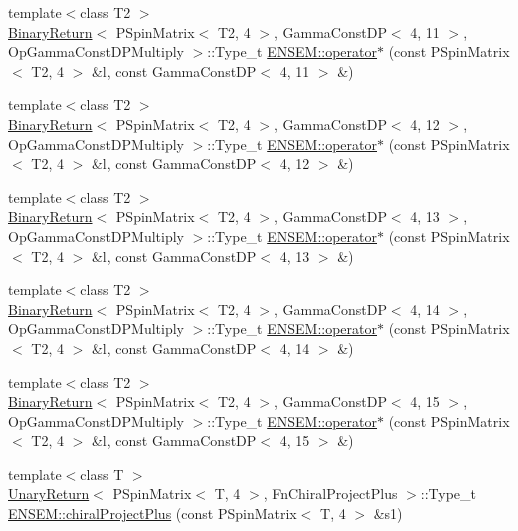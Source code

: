 \begin{DoxyCompactItemize}
\item 
{\footnotesize template$<$class T2 $>$ }\\\mbox{\hyperlink{structBinaryReturn}{Binary\+Return}}$<$ P\+Spin\+Matrix$<$ T2, 4 $>$, Gamma\+Const\+DP$<$ 4, 11 $>$, Op\+Gamma\+Const\+D\+P\+Multiply $>$\+::Type\+\_\+t \mbox{\hyperlink{group__primspinmatrix_gafdfa5cea94c5b8301c476e73bf94071c}{E\+N\+S\+E\+M\+::operator$\ast$}} (const P\+Spin\+Matrix$<$ T2, 4 $>$ \&l, const Gamma\+Const\+DP$<$ 4, 11 $>$ \&)
\item 
{\footnotesize template$<$class T2 $>$ }\\\mbox{\hyperlink{structBinaryReturn}{Binary\+Return}}$<$ P\+Spin\+Matrix$<$ T2, 4 $>$, Gamma\+Const\+DP$<$ 4, 12 $>$, Op\+Gamma\+Const\+D\+P\+Multiply $>$\+::Type\+\_\+t \mbox{\hyperlink{group__primspinmatrix_ga554a403dc2f232b906a5f7a9971eced3}{E\+N\+S\+E\+M\+::operator$\ast$}} (const P\+Spin\+Matrix$<$ T2, 4 $>$ \&l, const Gamma\+Const\+DP$<$ 4, 12 $>$ \&)
\item 
{\footnotesize template$<$class T2 $>$ }\\\mbox{\hyperlink{structBinaryReturn}{Binary\+Return}}$<$ P\+Spin\+Matrix$<$ T2, 4 $>$, Gamma\+Const\+DP$<$ 4, 13 $>$, Op\+Gamma\+Const\+D\+P\+Multiply $>$\+::Type\+\_\+t \mbox{\hyperlink{group__primspinmatrix_ga1b7bc726f48b4c37350818e1d825d16d}{E\+N\+S\+E\+M\+::operator$\ast$}} (const P\+Spin\+Matrix$<$ T2, 4 $>$ \&l, const Gamma\+Const\+DP$<$ 4, 13 $>$ \&)
\item 
{\footnotesize template$<$class T2 $>$ }\\\mbox{\hyperlink{structBinaryReturn}{Binary\+Return}}$<$ P\+Spin\+Matrix$<$ T2, 4 $>$, Gamma\+Const\+DP$<$ 4, 14 $>$, Op\+Gamma\+Const\+D\+P\+Multiply $>$\+::Type\+\_\+t \mbox{\hyperlink{group__primspinmatrix_ga701841ed0546a547ae068731f72d9054}{E\+N\+S\+E\+M\+::operator$\ast$}} (const P\+Spin\+Matrix$<$ T2, 4 $>$ \&l, const Gamma\+Const\+DP$<$ 4, 14 $>$ \&)
\item 
{\footnotesize template$<$class T2 $>$ }\\\mbox{\hyperlink{structBinaryReturn}{Binary\+Return}}$<$ P\+Spin\+Matrix$<$ T2, 4 $>$, Gamma\+Const\+DP$<$ 4, 15 $>$, Op\+Gamma\+Const\+D\+P\+Multiply $>$\+::Type\+\_\+t \mbox{\hyperlink{group__primspinmatrix_ga06378dd69a5d2daf15d11b69a3f42acd}{E\+N\+S\+E\+M\+::operator$\ast$}} (const P\+Spin\+Matrix$<$ T2, 4 $>$ \&l, const Gamma\+Const\+DP$<$ 4, 15 $>$ \&)
\item 
{\footnotesize template$<$class T $>$ }\\\mbox{\hyperlink{structUnaryReturn}{Unary\+Return}}$<$ P\+Spin\+Matrix$<$ T, 4 $>$, Fn\+Chiral\+Project\+Plus $>$\+::Type\+\_\+t \mbox{\hyperlink{group__primspinmatrix_ga6005e8f3442735f70e74a218c3d5a141}{E\+N\+S\+E\+M\+::chiral\+Project\+Plus}} (const P\+Spin\+Matrix$<$ T, 4 $>$ \&s1)

\end{DoxyCompactItemize}
